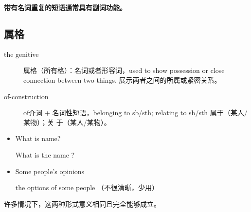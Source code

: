 \textbf{带有名词重复的短语通常具有副词功能。}

\subsection{属格}

\begin{description}
\item[the genitive] 属格（所有格）：名词或者形容词，used to show possession or
  close connection between two things. 展示两者之间的所属或紧密关系。
\item[of-construction] of介词 + 名词性短语，belonging to sb/sth; relating to sb/sth 属于（某人/某物）；关
  于（某人/某物）。
\end{description}

\begin{itemize}
\item What is  name?

  What is the name ?

\item Some people's opinions

  the options of some people （不很清晰，少用）
\end{itemize}
许多情况下，这两种形式意义相同且完全能够成立。

